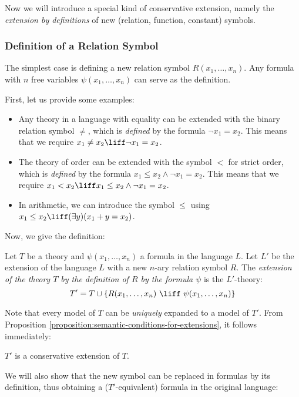 Now we will introduce a special kind of conservative extension, namely the \emph{extension by definitions} of new (relation, function, constant) symbols.

\subsubsection*{Definition of a Relation Symbol}

The simplest case is defining a new relation symbol $R(x_1,\dots,x_n)$. Any formula with $n$ free variables $\psi(x_1,\dots,x_n)$ can serve as the definition.

\begin{example}
First, let us provide some examples:
\begin{itemize}
    \item Any theory in a language with equality can be extended with the binary relation symbol $\neq$, which is \emph{defined} by the formula $\neg x_1=x_2$. This means that we require $x_1\neq x_2\liff\neg x_1=x_2$.
    \item The theory of order can be extended with the symbol $<$ for strict order, which is \emph{defined} by the formula $x_1\leq x_2\land \neg x_1=x_2$. This means that we require $x_1<x_2 \liff x_1\leq x_2\land \neg x_1=x_2$.
    \item In arithmetic, we can introduce the symbol $\leq$ using $x_1\leq x_2\liff(\exists y)(x_1+y=x_2)$.
\end{itemize}
\end{example}
Now, we give the definition:
\begin{definition}
    Let $T$ be a theory and $\psi(x_1,\dots,x_n)$ a formula in the language $L$. Let $L'$ be the extension of the language $L$ with a new $n$-ary relation symbol $R$. The \emph{extension of the theory $T$ by the definition of $R$ by the formula $\psi$} is the $L'$-theory:
    $$
    T'=T\cup\{R(x_1,\dots,x_n)\ \liff\ \psi(x_1,\dots,x_n)\}
    $$
\end{definition}
Note that every model of $T$ can be \emph{uniquely} expanded to a model of $T'$. From Proposition \ref{proposition:semantic-conditions-for-extensions}, it follows immediately:
\begin{corollary}
    $T'$ is a conservative extension of $T$.
\end{corollary}

We will also show that the new symbol can be replaced in formulas by its definition, thus obtaining a ($T'$-equivalent) formula in the original language:

